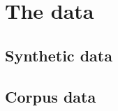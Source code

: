 \section{The data}
\lipsum[1]

\subsection{Synthetic data}
\lipsum[1]

\subsection{Corpus data}
\lipsum[1]
